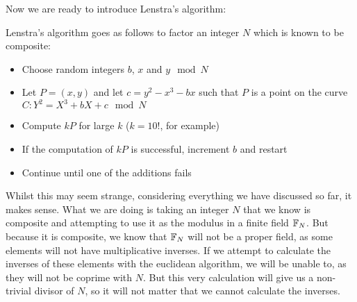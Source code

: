 Now we are ready to introduce Lenstra's algorithm:
\begin{definition}
	Lenstra's algorithm goes as follows to factor an integer $N$ which is known to be composite:
	\begin{itemize}
		\item Choose random integers $b$, $x$ and $y \mod N$
		\item Let $P = (x,y)$ and let $c = y^2 - x^3 - bx$ such that $P$ is a point on the curve $C: Y^2 = X^3 +bX + c \mod N$
		\item Compute $kP$ for large $k$ ($k=10!$, for example)
		\item If the computation of $kP$ is successful, increment $b$ and restart
		\item Continue until one of the additions fails
	\end{itemize}
\end{definition}
Whilst this may seem strange, considering everything we have discussed so far, it makes sense.
What we are doing is taking an integer $N$ that we know is composite and attempting to use it as the modulus in a finite field $\fp[N]$.
But because it is composite, we know that $\fp[N]$ will not be a proper field, as some elements will not have multiplicative inverses.
If we attempt to calculate the inverses of these elements with the euclidean algorithm, we will be unable to, as they will not be coprime with $N$.
But this very calculation will give us a non-trivial divisor of $N$, so it will not matter that we cannot calculate the inverses.
